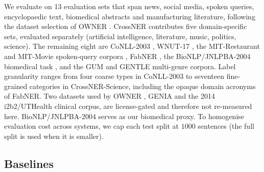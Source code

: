 We evaluate on 13 evaluation sets that span news, social media, spoken queries, encyclopaedic text, biomedical abstracts and manufacturing literature, following the dataset selection of OWNER \cite{genest2025owner}.
CrossNER \cite{liu2021crossner} contributes five domain-specific sets, evaluated separately (artificial intelligence, literature, music, politics, science).
The remaining eight are CoNLL-2003 \cite{tjongkimsang2003conll}, WNUT-17 \cite{derczynski2017wnut}, the MIT-Restaurant and MIT-Movie spoken-query corpora \cite{liu2013asgard}, FabNER \cite{kumar2022fabner}, the BioNLP/JNLPBA-2004 biomedical task \cite{kim2004jnlpba}, and the GUM \cite{zeldes2017gum} and GENTLE \cite{aoyama2023gentle} multi-genre corpora.
Label granularity ranges from four coarse types in CoNLL-2003 to seventeen fine-grained categories in CrossNER-Science, including the opaque domain acronyms of FabNER.
Two datasets used by OWNER \cite{genest2025owner}, GENIA \cite{kim2003genia} and the 2014 i2b2\slash UTHealth clinical corpus, are license-gated and therefore not re-measured here. BioNLP/JNLPBA-2004 serves as our biomedical proxy.
To homogenise evaluation cost across systems, we cap each test split at $1000$ sentences (the full split is used when it is smaller).

\subsection{Baselines}
\label{sec:exp:baselines}

